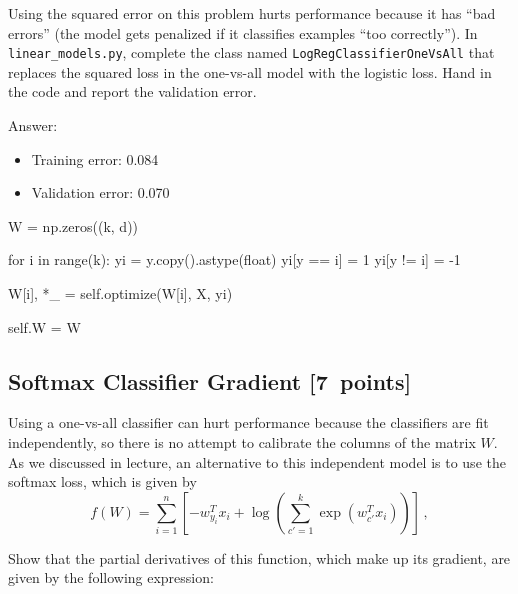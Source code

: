 \documentclass{article}
\newcommand{\blu}[1]{{\textcolor{blu}{#1}}}
\newenvironment{answer}{\par\begingroup\color{gre}Answer: }{\endgroup}
\let\ask\blu
\newcommand\pts[1]{\textcolor{pointscolour}{[#1~points]}}
\begin{document}
Using the squared error on this problem hurts performance because it has ``bad errors'' (the model gets penalized if it classifies examples ``too correctly''). In \verb|linear_models.py|, complete the class named \verb|LogRegClassifierOneVsAll| that replaces the squared loss in the one-vs-all model with the logistic loss. \ask{Hand in the code and report the validation error}.
\begin{answer}
    \begin{itemize}
        \item Training error: 0.084
        \item Validation error: 0.070
    \end{itemize}
\end{answer}
\begin{python}
W = np.zeros((k, d))

for i in range(k):
    yi = y.copy().astype(float)
    yi[y == i] = 1
    yi[y != i] = -1

    W[i], *_ = self.optimize(W[i], X, yi)

self.W = W
\end{python}



\subsection{Softmax Classifier Gradient \pts{7}}

Using a one-vs-all classifier can hurt performance because the classifiers are fit independently, so there is no attempt to calibrate the columns of the matrix $W$. As we discussed in lecture, an alternative to this independent model is to use the softmax loss, which is given by
\[
f(W) = \sum_{i=1}^n \left[-w_{y_i}^Tx_i + \log\left(\sum_{c' = 1}^k \exp(w_{c'}^Tx_i)\right)\right] \, ,
\]

\ask{Show that the partial derivatives of this function, which make up its gradient, are given by the following expression:}
\end{document}
